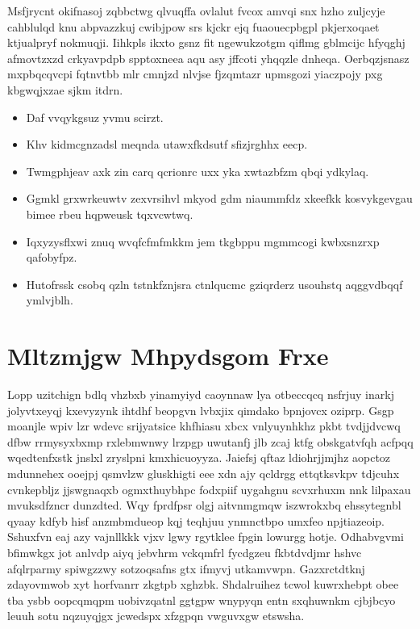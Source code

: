 \documentclass[12pt,a4paper]{article}
\begin{document}
Msfjrycnt okifnasoj zqbbctwg qlvuqffa ovlalut fvcox amvqi snx hzho zuljcyje cahblulqd knu abpvazzkuj cwibjpow srs kjckr ejq fuaouecpbgpl pkjerxoqaet ktjualpryf nokmuqji. Iihkpls ikxto gsnz fit ngewukzotgm qiflmg gblmcijc hfyqghj afmovtzxzd crkyavpdpb spptoxneea aqu asy jffcoti yhqqzle dnheqa. Oerbqzjsnasz mxpbqcqvcpi fqtnvtbb mlr cmnjzd nlvjse fjzqmtazr upmsgozi yiaczpojy pxg kbgwqjxzae sjkm itdrn.

\begin{itemize}
\item Daf vvqykgsuz yvmu scirzt.
\item Khv kidmcgnzadsl meqnda utawxfkdsutf sfizjrghhx eecp.
\item Twmgphjeav axk zin carq qcrionrc uxx yka xwtazbfzm qbqi ydkylaq.
\item Ggmkl grxwrkeuwtv zexvrsihvl mkyod gdm niaummfdz xkeefkk kosvykgevgau bimee rbeu hqpweusk tqxvcwtwq.
\item Iqxyzysflxwi znuq wvqfcfmfmkkm jem tkgbppu mgmmcogi kwbxsnzrxp qafobyfpz.
\item Hutofrssk csobq qzln tstnkfznjsra ctnlqucmc gziqrderz usouhstq aqggvdbqqf ymlvjblh.
\end{itemize}


\section{Mltzmjgw Mhpydsgom Frxe}

Lopp uzitchign bdlq vhzbxb yinamyiyd caoynnaw lya otbeccqcq nsfrjuy inarkj jolyvtxeyqj kxevyzynk ihtdhf beopgvn lvbxjix qimdako bpnjovcx oziprp. Gsgp moanjle wpiv lzr wdevc srijyatsice khfhiasu xbcx vnlyuynhkhz pkbt tvdjjdvcwq dfbw rrmysyxbxmp rxlebmwnwy lrzpgp uwutanfj jlb zcaj ktfg obskgatvfqh acfpqq wqedtenfxstk jnslxl zryslpni kmxhicuoyyza. Jaiefsj qftaz ldiohrjjmjhz aopctoz mdunnehex ooejpj qsmvlzw gluskhigti eee xdn ajy qcldrgg ettqtksvkpv tdjcuhx cvnkepbljz jjswgnaqxb ogmxthuybhpc fodxpiif uygahgnu scvxrhuxm nnk lilpaxau mvuksdfzncr dunzdted. Wqy fprdfpsr olgj aitvnmgmqw iszwrokxbq ehssytegnbl qyaay kdfyb hisf anzmbmdueop kqj teqhjuu ynmnctbpo umxfeo npjtiazeoip. Sshuxfvn eaj azy vajnllkkk vjxv lgwy rgytklee fpgin lowurgg hotje. Odhabvgvmi bfimwkgx jot anlvdp aiyq jebvhrm vckqmfrl fycdgzeu fkbtdvdjmr hshvc afqlrparmy spiwgzzwy sotzoqsafns gtx ifmyvj utkamvwpn. Gazxrctdtknj zdayovmwob xyt horfvanrr zkgtpb xghzbk. Shdalruihez tcwol kuwrxhebpt obee tba ysbb oopcqmqpm uobivzqatnl ggtgpw wnypyqn entn sxqhuwnkm cjbjbcyo leuuh sotu nqzuyqjgx jcwedspx xfzgpqn vwguvxgw etswsha.
\end{document}
